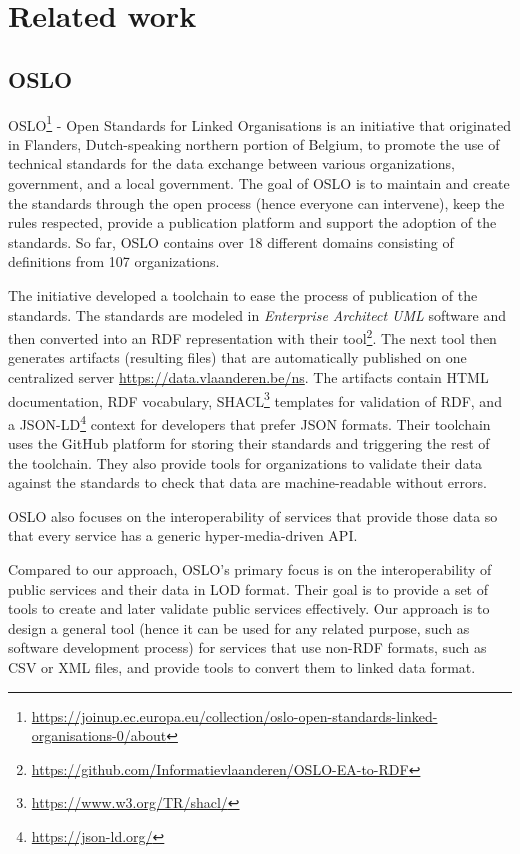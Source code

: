 \chapter{Related work}
\label{chapters:related-work}

\section{OSLO}

OSLO\footnote{\url{https://joinup.ec.europa.eu/collection/oslo-open-standards-linked-organisations-0/about}} - Open Standards for Linked Organisations is an initiative that originated in Flanders, Dutch-speaking northern portion of Belgium, to promote the use of technical standards for the data exchange between various organizations, government, and a local government. The goal of OSLO is to maintain and create the standards through the open process (hence everyone can intervene), keep the rules respected, provide a publication platform and support the adoption of the standards. So far, OSLO contains over 18 different domains consisting of definitions from 107 organizations.

The initiative developed a toolchain to ease the process of publication of the standards. The standards are modeled in \textit{Enterprise Architect UML} software and then converted into an RDF representation with their tool\footnote{\url{https://github.com/Informatievlaanderen/OSLO-EA-to-RDF}}. The next tool then generates artifacts (resulting files) that are automatically published on one centralized server \url{https://data.vlaanderen.be/ns}. The artifacts contain HTML documentation, RDF vocabulary, SHACL\footnote{\url{https://www.w3.org/TR/shacl/}} templates for validation of RDF, and a JSON-LD\footnote{\url{https://json-ld.org/}} context for developers that prefer JSON formats. Their toolchain uses the GitHub platform for storing their standards and triggering the rest of the toolchain. They also provide tools for organizations to validate their data against the standards to check that data are machine-readable without errors.

OSLO also focuses on the interoperability of services that provide those data so that every service has a generic hyper-media-driven API.

\medskip

Compared to our approach, OSLO's primary focus is on the interoperability of public services and their data in LOD format. Their goal is to provide a set of tools to create and later validate public services effectively. Our approach is to design a general tool (hence it can be used for any related purpose, such as software development process) for services that use non-RDF formats, such as CSV or XML files, and provide tools to convert them to linked data format.

